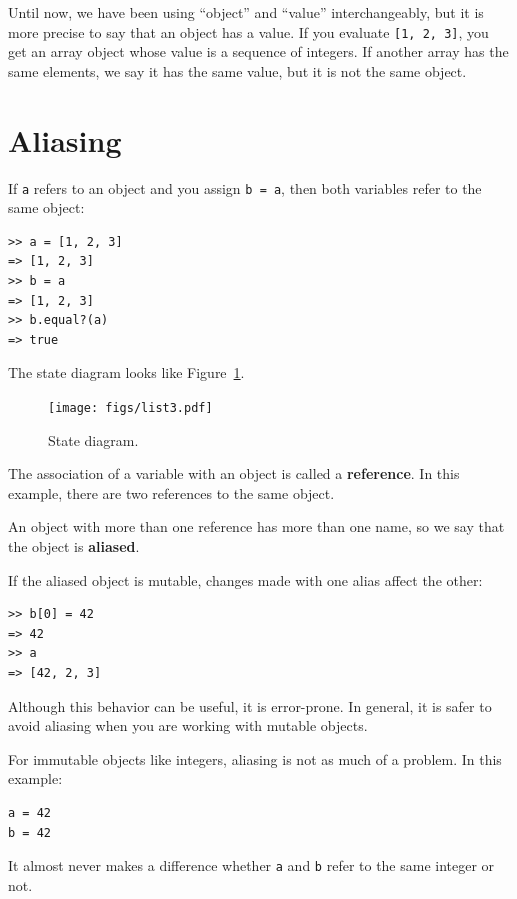 \documentclass[10pt]{book}
\begin{document}
Until now, we have been using ``object'' and ``value''
interchangeably, but it is more precise to say that an object has a
value.  If you evaluate {\tt [1, 2, 3]}, you get an array
object whose value is a sequence of integers.  If another
array has the same elements, we say it has the same value, but
it is not the same object.


\section{Aliasing}

If {\tt a} refers to an object and you assign {\tt b = a},
then both variables refer to the same object:

\begin{verbatim}
>> a = [1, 2, 3]
=> [1, 2, 3]
>> b = a
=> [1, 2, 3]
>> b.equal?(a)
=> true
\end{verbatim}
%
The state diagram looks like Figure~\ref{fig.list3}.

\begin{figure}
\centerline
{\texttt{[image: figs/list3.pdf]}}
\caption{State diagram.}
\label{fig.list3}
\end{figure}

The association of a variable with an object is called a {\bf
reference}.  In this example, there are two references to the same
object.

An object with more than one reference has more
than one name, so we say that the object is {\bf aliased}.

If the aliased object is mutable, changes made with one alias affect
the other:

\begin{verbatim}
>> b[0] = 42
=> 42
>> a
=> [42, 2, 3]
\end{verbatim}
%
Although this behavior can be useful, it is error-prone.  In general,
it is safer to avoid aliasing when you are working with mutable
objects.

For immutable objects like integers, aliasing is not as much of a
problem.  In this example:

\begin{verbatim}
a = 42
b = 42
\end{verbatim}
%
It almost never makes a difference whether {\tt a} and {\tt b} refer
to the same integer or not.
\end{document}
